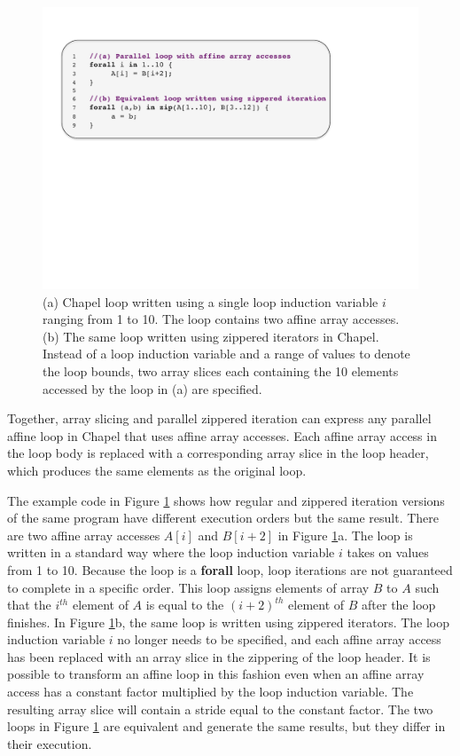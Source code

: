 \begin{figure}
\begin{center}
\includegraphics[scale=0.40]{./Figures/affine_loop}
\caption{(a) Chapel loop written using a single loop induction variable $i$ ranging from 1 to 10. The loop contains two affine array accesses. (b) The same loop written using zippered iterators in Chapel. Instead of a loop induction variable and a range of values to denote the loop bounds, two array slices each containing the 10 elements accessed by the loop in (a) are specified.}
\label{affine_loop}
\end{center}
\end{figure}

Together, array slicing and parallel zippered iteration can express any parallel affine loop in Chapel that uses affine array accesses. Each affine array access in the loop body is replaced with a corresponding array slice in the loop header, which produces the same elements as the original loop. 

The example code in Figure \ref{affine_loop} shows how regular and zippered iteration versions of the same program have different execution orders but the same result. There are two affine array accesses $A[i]$ and $B[i+2]$ in Figure \ref{affine_loop}a. The loop is written in a standard way where the loop induction variable $i$ takes on values from 1 to 10. Because the loop is a \textbf{forall} loop, loop iterations are not guaranteed to complete in a specific order. This loop assigns elements of array $B$ to $A$ such that the $i^{th}$ element of $A$ is equal to the $(i+2)^{th}$ element of $B$ after the loop finishes. In Figure \ref{affine_loop}b, the same loop is written using zippered iterators. The loop induction variable $i$ no longer needs to be specified, and each affine array access has been replaced with an array slice in the zippering of the loop header. It is possible to transform an affine loop in this fashion even when an affine array access has a constant factor multiplied by the loop induction variable. The resulting array slice will contain a stride equal to the constant factor. The two loops in Figure \ref{affine_loop} are equivalent and generate the same results, but they differ in their execution.

